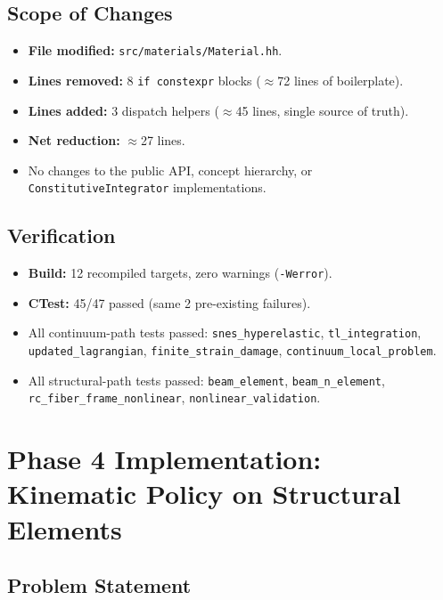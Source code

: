 \subsection{Scope of Changes}

\begin{itemize}
  \item \textbf{File modified:} \texttt{src/materials/Material.hh}.
  \item \textbf{Lines removed:} 8 \texttt{if constexpr} blocks
        ($\approx$72 lines of boilerplate).
  \item \textbf{Lines added:} 3 dispatch helpers
        ($\approx$45 lines, single source of truth).
  \item \textbf{Net reduction:} $\approx$27 lines.
  \item No changes to the public API, concept hierarchy, or
        \texttt{ConstitutiveIntegrator} implementations.
\end{itemize}

\subsection{Verification}

\begin{itemize}
  \item \textbf{Build:} 12 recompiled targets, zero warnings
        (\texttt{-Werror}).
  \item \textbf{CTest:} 45/47 passed (same 2 pre-existing failures).
  \item All continuum-path tests passed:
        \texttt{snes\_hyperelastic},
        \texttt{tl\_integration},
        \texttt{updated\_lagrangian},
        \texttt{finite\_strain\_damage},
        \texttt{continuum\_local\_problem}.
  \item All structural-path tests passed:
        \texttt{beam\_element},
        \texttt{beam\_n\_element},
        \texttt{rc\_fiber\_frame\_nonlinear},
        \texttt{nonlinear\_validation}.
\end{itemize}


\section{Phase 4 Implementation: Kinematic Policy on Structural Elements}
\label{sec:phase4-kinematic-policy}

\subsection{Problem Statement}

